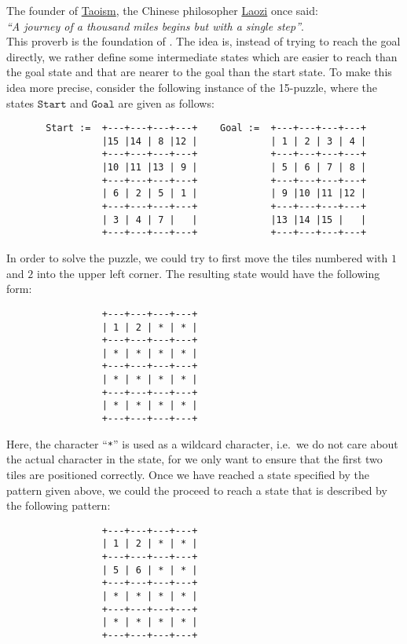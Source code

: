 \exercise
The founder of \href{https://en.wikipedia.org/wiki/Taoism}{Taoism}, the Chinese philosopher
\href{https://en.wikipedia.org/wiki/Laozi}{Laozi} once said:
\\[0.2cm]
\hspace*{1.3cm}
\textsl{``A journey of a thousand miles begins but with a single step''}.
\\[0.2cm]
This proverb is the foundation of .  The idea is, instead of trying to reach
the goal directly, we rather define some intermediate states which are easier to reach than the goal state and
that are nearer to the goal than the start state.  To make this idea more precise, consider the following instance of the
15-puzzle, where the states $\texttt{Start}$ and $\texttt{Goal}$ are given as follows:
\begin{verbatim}
       Start :=  +---+---+---+---+    Goal :=  +---+---+---+---+
                 |15 |14 | 8 |12 |             | 1 | 2 | 3 | 4 |
                 +---+---+---+---+             +---+---+---+---+
                 |10 |11 |13 | 9 |             | 5 | 6 | 7 | 8 |
                 +---+---+---+---+             +---+---+---+---+
                 | 6 | 2 | 5 | 1 |             | 9 |10 |11 |12 |
                 +---+---+---+---+             +---+---+---+---+
                 | 3 | 4 | 7 |   |             |13 |14 |15 |   |
                 +---+---+---+---+             +---+---+---+---+
\end{verbatim}
In order to solve the puzzle, we could try to first move the tiles numbered with $1$ and $2$ into the upper left
corner.  The resulting state would have the following form:
\begin{verbatim}
                 +---+---+---+---+
                 | 1 | 2 | * | * |
                 +---+---+---+---+
                 | * | * | * | * |
                 +---+---+---+---+
                 | * | * | * | * |
                 +---+---+---+---+
                 | * | * | * | * |
                 +---+---+---+---+
\end{verbatim}
Here, the character ``\texttt{*}'' is used as a wildcard character, i.e.~we do not care about the actual
character in the state, for we only want to ensure that the first two tiles are positioned correctly.  Once we have reached a
state specified by the pattern given above, we could the proceed to reach a state that is described by the
following pattern:
\begin{verbatim}
                 +---+---+---+---+
                 | 1 | 2 | * | * |
                 +---+---+---+---+
                 | 5 | 6 | * | * |
                 +---+---+---+---+
                 | * | * | * | * |
                 +---+---+---+---+
                 | * | * | * | * |
                 +---+---+---+---+
\end{verbatim}
